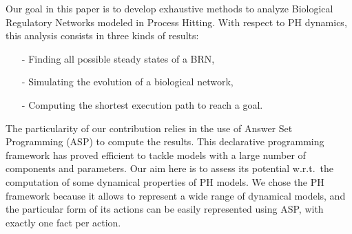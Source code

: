 Our goal in this paper is to develop exhaustive methods to analyze Biological Regulatory Networks modeled in Process Hitting. With respect to PH dynamics, this analysis consists in three kinds of results:
\begin{itemize}
\item[-] Finding all possible steady states of a BRN,
\item[-] Simulating the evolution of a biological network,
\item[-] Computing the shortest execution path to reach a goal.
\end{itemize}
 The particularity of our contribution relies in the use of Answer Set Programming
(ASP) \cite{baral2003knowledge}
to compute the results.
This declarative programming framework has proved efficient
to tackle models with a large number of components and parameters.
Our aim here is to assess its potential w.r.t.\ the computation
of some dynamical properties of PH models.
We chose the PH framework because it allows to represent a wide range of dynamical models,
and the particular form of its actions
can be easily represented using ASP,
with exactly one fact per action.
